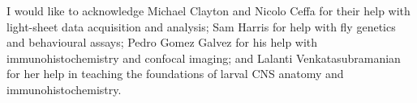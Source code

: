 
\begin{acknowledgements}      


I would like to acknowledge Michael Clayton and Nicolo Ceffa for their help with light-sheet data acquisition and analysis; Sam Harris for help with fly genetics and behavioural assays; Pedro Gomez Galvez for his help with immunohistochemistry and confocal imaging; and Lalanti Venkatasubramanian for her help in teaching the foundations of larval CNS anatomy and immunohistochemistry.


\end{acknowledgements}